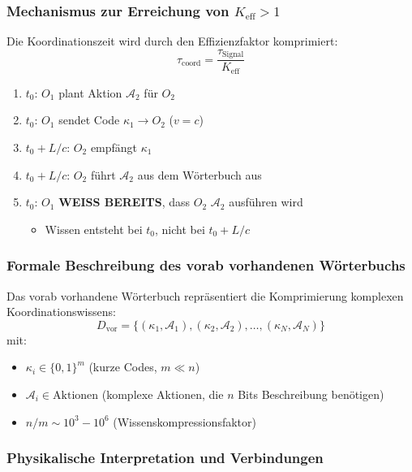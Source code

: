 \documentclass[11pt,a4paper]{article}
\begin{document}
	\subsubsection{Mechanismus zur Erreichung von $K_{\mathrm{eff}} > 1$}
	
	Die Koordinationszeit wird durch den Effizienzfaktor komprimiert:
	\begin{equation}
		\tau_{\text{coord}} = \frac{\tau_{\text{Signal}}}{K_{\mathrm{eff}}}
	\end{equation}
	
	\begin{enumerate}[label=\arabic*.]
		\item $t_0$: $O_1$ plant Aktion $\mathcal{A}_2$ für $O_2$
		\item $t_0$: $O_1$ sendet Code $\kappa_1 \to O_2$ ($v = c$)
		\item $t_0 + L/c$: $O_2$ empfängt $\kappa_1$
		\item $t_0 + L/c$: $O_2$ führt $\mathcal{A}_2$ aus dem Wörterbuch aus
		\item $t_0$: $O_1$ \textbf{WEISS BEREITS}, dass $O_2$ $\mathcal{A}_2$ ausführen wird
		\begin{itemize}
			\item Wissen entsteht bei $t_0$, nicht bei $t_0 + L/c$
		\end{itemize}
	\end{enumerate}
	
	\subsubsection{Formale Beschreibung des vorab vorhandenen Wörterbuchs}
	
	Das vorab vorhandene Wörterbuch repräsentiert die Komprimierung komplexen Koordinationswissens:
	\begin{equation}
		D_{\text{vor}} = \{(\kappa_1, \mathcal{A}_1), (\kappa_2, \mathcal{A}_2), \dots, (\kappa_N, \mathcal{A}_N)\}
	\end{equation}
	mit:
	\begin{itemize}
		\item $\kappa_i \in \{0,1\}^m$ (kurze Codes, $m \ll n$)
		\item $\mathcal{A}_i \in \text{Aktionen}$ (komplexe Aktionen, die $n$ Bits Beschreibung benötigen)
		\item $n/m \sim 10^3-10^6$ (Wissenskompressionsfaktor)
	\end{itemize}
	
	\subsubsection{Physikalische Interpretation und Verbindungen}
	
\end{document}
